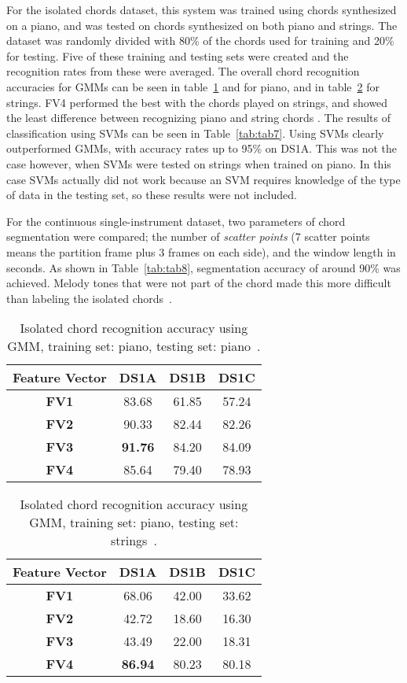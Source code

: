 \documentclass{sig-alternate}
\begin{document}
For the isolated chords dataset, this system was trained using chords synthesized on a piano, and was tested on chords synthesized on both piano and strings. The dataset was randomly divided with 80\% of the chords used for training and 20\% for testing. Five of these training and testing sets were created and the recognition rates from these were averaged. The overall chord recognition accuracies for GMMs can be seen in table~\ref{tab:tab3} and for piano, and in table~\ref{tab:tab4} for strings. FV4 performed the best with the chords played on strings, and showed the least difference between recognizing piano and string chords \cite{Morman:2006}. The results of classification using SVMs can be seen in Table~\ref{tab:tab7}. Using SVMs clearly outperformed GMMs, with accuracy rates up to 95\% on DS1A. This was not the case however, when SVMs were tested on strings when trained on piano. In this case SVMs actually did not work because an SVM requires knowledge of the type of data in the testing set, so these results were not included.  

For the continuous single-instrument dataset, two parameters of chord segmentation were compared; the number of \textit{scatter points} (7 scatter points means the partition frame plus 3 frames on each side), and the window length in seconds. As shown in Table~\ref{tab:tab8}, segmentation accuracy of around 90\% was achieved. Melody tones that were not part of the chord made this more difficult than labeling the isolated chords~\cite{Morman:2006}. 

\begin{table}
\centering
\begin{tabular}{|c|c|c|c|} \hline
\textbf{Feature Vector} & \textbf{DS1A} & \textbf{DS1B} & \textbf{DS1C} \\ \hline
\textbf{FV1} & 83.68 & 61.85 & 57.24 \\ \hline
\textbf{FV2} & 90.33 & 82.44 & 82.26 \\ \hline
\textbf{FV3} & \textbf{91.76} & 84.20 & 84.09 \\ \hline
\textbf{FV4} & 85.64 & 79.40 & 78.93 \\ \hline
\end{tabular}
\caption{Isolated chord recognition accuracy using GMM, training set: piano, testing set: piano~\cite{Morman:2006}.}
\label{tab:tab3}
\end{table} 

\begin{table}
\centering
\begin{tabular}{|c|c|c|c|} \hline
\textbf{Feature Vector} & \textbf{DS1A} & \textbf{DS1B} & \textbf{DS1C} \\ \hline
\textbf{FV1} & 68.06 & 42.00 & 33.62 \\ \hline
\textbf{FV2} & 42.72 & 18.60 & 16.30 \\ \hline
\textbf{FV3} & 43.49 & 22.00 & 18.31 \\ \hline
\textbf{FV4} & \textbf{86.94} & 80.23 & 80.18 \\ \hline
\end{tabular}
\caption{Isolated chord recognition accuracy using GMM, training set: piano, testing set: strings~\cite{Morman:2006}.}
\label{tab:tab4}
\end{table}
\end{document}
